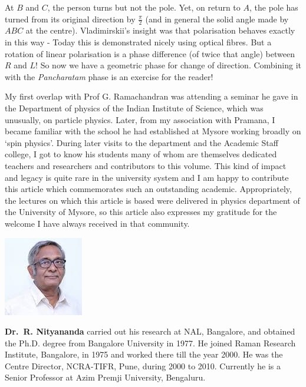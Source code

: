 At $B$ and $C$, the person turns but not the pole. Yet, on return to $A$, the pole
has turned from its original direction by $\frac{\pi}{2}$ (and in general the solid angle made
by $ABC$ at the centre). Vladimirskii's insight was that polarisation behaves
exactly in this way - Today this is demonstrated nicely using optical fibres.
But a rotation of linear polarisation is a phase difference (of twice that angle)
between $R$ and $L$! So now we have a geometric phase for change of direction.
Combining it with the \textit{Pancharatam} phase is an exercise for the reader!

My first overlap with Prof G. Ramachandran was attending a seminar he gave in the
Department of physics of the Indian Institute of Science, which was unusually, on particle
physics. Later, from my association with Pramana, I became familiar with the school he had
established at Mysore working broadly on `spin physics'. During later visits to the
department and the Academic Staff college, I got to know his students many of whom are
themselves dedicated teachers and researchers and contributors to this volume. This kind
of impact and legacy is quite rare in the university system and I am happy to contribute this
article which commemorates such an outstanding academic. Appropriately, the lectures on
which this article is based were delivered in physics department of the University of
Mysore, so this article also expresses my gratitude for the welcome I have always received in
that community.
\vskip 1cm


\centerline{\includegraphics[scale=0.9]{authorsphotos/Prof_Rajaram_Nityananda.jpg}} 
\bigskip

\noindent
\textbf{Dr.\ R. Nityananda} carried out his research at NAL, Bangalore, and obtained the Ph.D. degree from Bangalore University in 1977. He joined Raman Research Institute, Bangalore, in 1975 and worked there till the year 2000.  He was the Centre Director, NCRA-TIFR, Pune, during 2000 to 2010. Currently he is a Senior Professor at Azim Premji University, Bengaluru.
